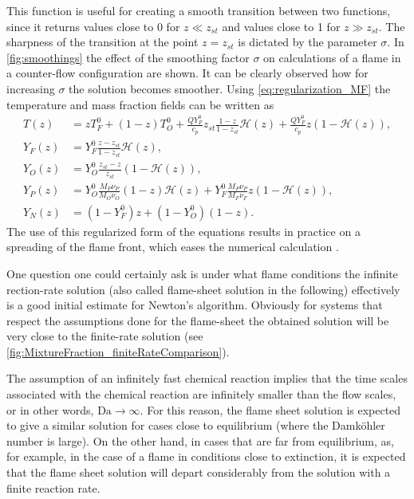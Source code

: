 This function is useful for creating a smooth transition between two functions, since it returns values close to 0 for $z \ll z_{st}$ and values close to 1 for $z \gg z_{st}$. The sharpness of the transition at the point $z = z_{st}$ is dictated by the parameter $\sigma$. In \cref{fig:smoothings} the effect of the smoothing factor $\sigma$ on calculations of a flame in a counter-flow configuration are shown. It can be clearly observed how for increasing $\sigma$ the solution becomes smoother. Using \cref{eq:regularization_MF} the temperature and mass fraction fields can be written as
\begin{subequations}
	\begin{align}
		T(z)   & = z T_F^0 + (1-z)T_O^0 + \frac{Q Y_F^0}{c_p} z_{st}\frac{1- z}{1-z_{st}}\mathcal{H}(z) +  \frac{Q Y_F^0}{c_p}z\left(1-\mathcal{H}(z)\right),  \label{eq:BS-TR} \\[1ex]
		Y_F(z) & = Y_F^0\frac{z - z_{st}}{1-z_{st}} \mathcal{H}(z), \label{eq:BS-YFR}                                                                                           \\[1ex]
		Y_O(z) & = Y_O^0 \frac{z_{st}-z}{z_{st}} (1-\mathcal{H}(z)), \label{eq:BS-YOR}                                                                                          \\[1ex]
		Y_P(z) & =  Y_O^0\frac{M_P\nu_P}{M_O\nu_O}(1-z)\mathcal{H}(z) +	Y_F^0\frac{M_P\nu_P}{M_F\nu_F}z (1-\mathcal{H}(z)), \label{eq:BS-YPR}                                   \\[1ex]
		Y_N(z) & = (1-Y_F^0)z + (1-Y_O^0)(1-z). \label{eq:BS-YNR}
	\end{align}
\end{subequations}
The use of this regularized form of the equations results in practice on a spreading of the flame front, which eases the numerical calculation \parencite{braackAdaptiveFiniteElement1997}.

One question one could certainly ask is under what flame conditions the infinite rection-rate solution (also called flame-sheet solution in the following) effectively is a good initial estimate for Newton's algorithm.  Obviously for systems that respect the assumptions done for the flame-sheet the obtained solution will be very close to the finite-rate solution (see \cref{fig:MixtureFraction_finiteRateComparison}). 

The assumption of an infinitely fast chemical reaction implies that the time scales associated with the chemical reaction are infinitely smaller than the flow scales, or in other words, $\text{Da} \to \infty$. For this reason, the flame sheet solution is expected to give a similar solution for cases close to equilibrium (where the Damköhler number is large). On the other hand, in cases that are far from equilibrium, as, for example, in the case of a flame in conditions close to extinction, it is expected that the flame sheet solution will depart considerably from the solution with a finite reaction rate.



